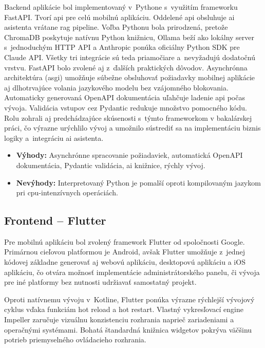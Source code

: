 Backend aplikácie bol implementovaný v~Pythone s~využitím frameworku FastAPI.
Tvorí \acrshort{api} pre celú mobilnú aplikáciu. Oddelené \acrshort{api}
obsluhuje \acrshort{ai} asistenta vrátane \acrshort{rag} pipeline. Voľba
Pythonu bola prirodzená, pretože ChromaDB poskytuje natívnu Python knižnicu,
Ollama beží ako lokálny server s~jednoduchým HTTP API a Anthropic ponúka
oficiálny Python SDK pre Claude API. Všetky tri integrácie sú teda priamočiare
a~nevyžadujú dodatočnú vrstvu. FastAPI bolo zvolené aj z~ďalších praktických
dôvodov. Asynchrónna architektúra (\acrshort{asgi}) umožňuje súbežne obsluhovať
požiadavky mobilnej aplikácie aj dlhotrvajúce volania jazykového modelu bez
vzájomného blokovania. Automaticky generovaná OpenAPI dokumentácia uľahčuje
ladenie \acrshort{api} počas vývoja. Validácia vstupov cez Pydantic redukuje
množstvo pomocného kódu. Rolu zohrali aj predchádzajúce skúsenosti s~týmto
frameworkom v bakalárskej práci, čo výrazne urýchlilo vývoj a umožnilo
sústrediť sa na implementáciu biznis logiky a~integráciu \acrshort{ai} asistenta.

\begin{itemize}
      \item \textbf{Výhody:} Asynchrónne spracovanie požiadaviek, automatická OpenAPI dokumentácia, Pydantic validácia, \acrshort{ai} knižnice, rýchly vývoj.
      \item \textbf{Nevýhody:} Interpretovaný Python je pomalší oproti kompilovaným jazykom pri \acrshort{cpu}-intenzívnych operáciách.
\end{itemize}

\subsection{Frontend -- Flutter}

Pre mobilnú aplikáciu bol zvolený framework Flutter od spoločnosti Google.
Primárnou cieľovou platformou je Android, avšak Flutter umožňuje z~jednej
kódovej základne generovať aj webovú aplikáciu, desktopovú aplikáciu a iOS
aplikáciu, čo otvára možnosť implementácie administrátorského panelu, či vývoja
pre iné platformy bez nutnosti udržiavať samostatný projekt.

Oproti natívnemu vývoju v~Kotline, Flutter ponúka výrazne rýchlejší vývojový
cyklus vďaka funkciám hot reload a hot restart. Vlastný vykresľovací engine
Impeller zaručuje vizuálnu konzistenciu rozhrania naprieč zariadeniami a
operačnými systémami. Bohatá štandardná knižnica widgetov pokrýva väčšinu
potrieb priemyselného ovládacieho rozhrania.

